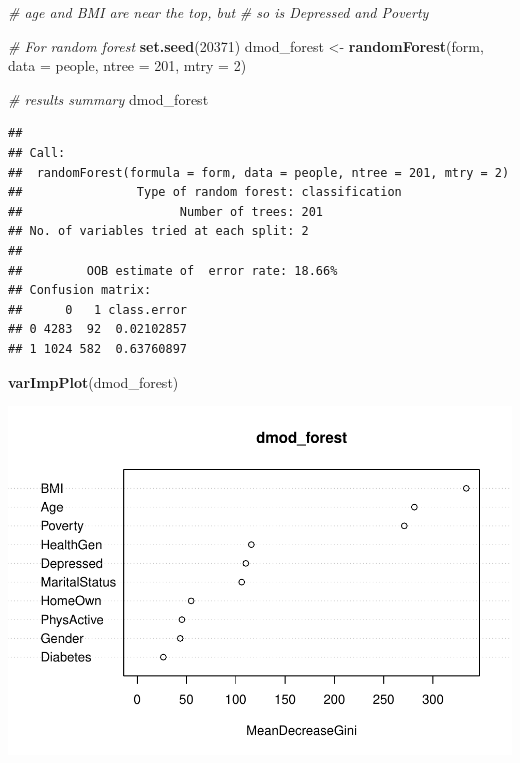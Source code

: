 \documentclass[]{article}
\newenvironment{Shaded}{\begin{snugshade}}{\end{snugshade}}
\newcommand{\KeywordTok}[1]{\textcolor[rgb]{0.13,0.29,0.53}{\textbf{{#1}}}}
\newcommand{\DataTypeTok}[1]{\textcolor[rgb]{0.13,0.29,0.53}{{#1}}}
\newcommand{\DecValTok}[1]{\textcolor[rgb]{0.00,0.00,0.81}{{#1}}}
\newcommand{\StringTok}[1]{\textcolor[rgb]{0.31,0.60,0.02}{{#1}}}
\newcommand{\CommentTok}[1]{\textcolor[rgb]{0.56,0.35,0.01}{\textit{{#1}}}}
\newcommand{\NormalTok}[1]{{#1}}
\begin{document}
\begin{Shaded}
\begin{Highlighting}[]
\CommentTok{# age and BMI are near the top, but }
\CommentTok{# so is Depressed and Poverty}

\CommentTok{# For random forest}
\KeywordTok{set.seed}\NormalTok{(}\DecValTok{20371}\NormalTok{)}
\NormalTok{dmod_forest <-}\StringTok{ }\KeywordTok{randomForest}\NormalTok{(form, }\DataTypeTok{data =} \NormalTok{people, }
                     \DataTypeTok{ntree =} \DecValTok{201}\NormalTok{, }\DataTypeTok{mtry =} \DecValTok{2}\NormalTok{)}

\CommentTok{# results summary}
\NormalTok{dmod_forest}
\end{Highlighting}
\end{Shaded}

\begin{verbatim}
## 
## Call:
##  randomForest(formula = form, data = people, ntree = 201, mtry = 2) 
##                Type of random forest: classification
##                      Number of trees: 201
## No. of variables tried at each split: 2
## 
##         OOB estimate of  error rate: 18.66%
## Confusion matrix:
##      0   1 class.error
## 0 4283  92  0.02102857
## 1 1024 582  0.63760897
\end{verbatim}

\begin{Shaded}
\begin{Highlighting}[]
\KeywordTok{varImpPlot}\NormalTok{(dmod_forest)}
\end{Highlighting}
\end{Shaded}

\includegraphics{Hmwk7AnswerKey_files/figure-latex/unnamed-chunk-13-2.pdf}
\end{document}

